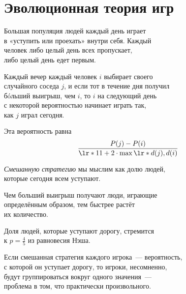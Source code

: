 ﻿\section{Эволюционная теория игр}

\begin{frame} 
Большая популяция людей каждый день играет \\
в «уступить или проехать» внутри себя. Каждый \\
человек либо целый день всех пропускает, \\
либо целый день едет первым.

Каждый вечер каждый человек \(i\) выбирает своего \\
случайного соседа \(j\), и если тот в течение дня получил \\
б\'oльший выигрыш, чем \(i\), то \(i\) на следующий день \\
с некоторой вероятностью начинает играть так, \\
как \(j\) играл сегодня.
\end{frame}


\begin{frame} 
Эта вероятность равна
	\[\frac{P(j) - P(i)}{\lr*{11+2} \cdot \max\lr*{d(j),d(i)}}\]

{\it Смешанную стратегию} мы мыслим как долю людей, \\
которые сегодня всем уступают.

Чем больший выигрыш получают люди, играющие \\
определённым образом, тем быстрее растёт \\
их количество.
\end{frame}


\begin{frame} 
	Доля людей, которые уступают дорогу, стремится \\
	к \(p = \frac45\) из равновесия Нэша.

	
\end{frame}


\begin{frame} 
	Если смешанная стратегия каждого игрока~— вероятность,\\
	с которой он уступает дорогу, то игроки, несомненно,\\
	будут группироваться вокруг одного значения~—\\
	проблема в том, что практически произвольного.\medskip

	
\end{frame}
